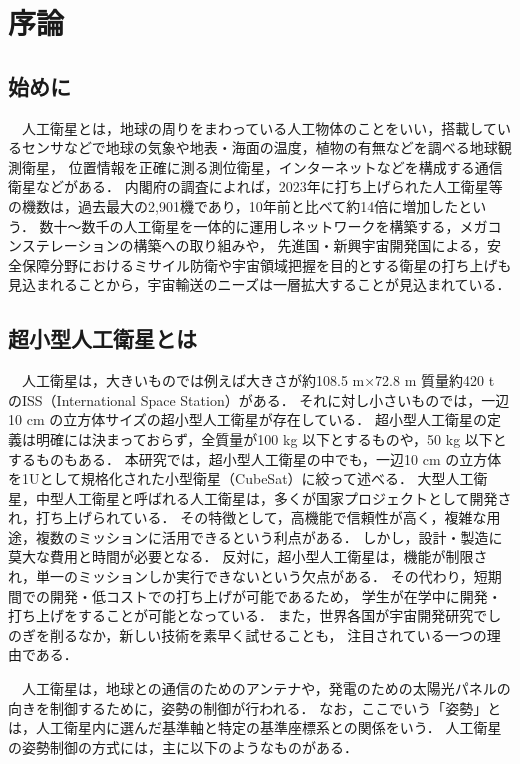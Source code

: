 \section{序論}
\subsection{始めに}
　人工衛星とは，地球の周りをまわっている人工物体のことをいい，搭載しているセンサなどで地球の気象や地表・海面の温度，植物の有無などを調べる地球観測衛星，
位置情報を正確に測る測位衛星，インターネットなどを構成する通信衛星などがある．
内閣府の調査によれば，2023年に打ち上げられた人工衛星等の機数は，過去最大の2,901機であり，10年前と比べて約14倍に増加したという\cite{intro1}．
数十～数千の人工衛星を一体的に運用しネットワークを構築する，メガコンステレーションの構築への取り組みや，
先進国・新興宇宙開発国による，安全保障分野におけるミサイル防衛や宇宙領域把握を目的とする衛星の打ち上げも見込まれることから，宇宙輸送のニーズは一層拡大することが見込まれている．


\subsection{超小型人工衛星とは}
　人工衛星は，大きいものでは例えば大きさが約108.5 m×72.8 m 質量約420 t のISS（International Space Station）がある\cite{intro2}．
それに対し小さいものでは，一辺10 cm の立方体サイズの超小型人工衛星が存在している．
超小型人工衛星の定義は明確には決まっておらず，全質量が100 kg 以下とするものや，50 kg 以下とするものもある．
本研究では，超小型人工衛星の中でも，一辺10 cm の立方体を1Uとして規格化された小型衛星（CubeSat）に絞って述べる．
大型人工衛星，中型人工衛星と呼ばれる人工衛星は，多くが国家プロジェクトとして開発され，打ち上げられている．
その特徴として，高機能で信頼性が高く，複雑な用途，複数のミッションに活用できるという利点がある．
しかし，設計・製造に莫大な費用と時間が必要となる．
反対に，超小型人工衛星は，機能が制限され，単一のミッションしか実行できないという欠点がある．
その代わり，短期間での開発・低コストでの打ち上げが可能であるため，
学生が在学中に開発・打ち上げをすることが可能となっている．
また，世界各国が宇宙開発研究でしのぎを削るなか，新しい技術を素早く試せることも，
注目されている一つの理由である．


　人工衛星は，地球との通信のためのアンテナや，発電のための太陽光パネルの向きを制御するために，姿勢の制御が行われる．
なお，ここでいう「姿勢」とは，人工衛星内に選んだ基準軸と特定の基準座標系との関係をいう\cite{intro3}．
人工衛星の姿勢制御の方式には，主に以下のようなものがある．

